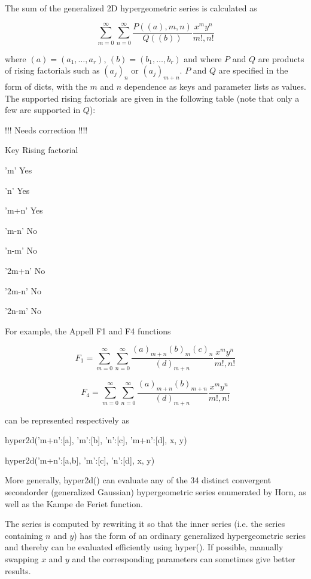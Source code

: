 \vpara
The sum of the generalized 2D hypergeometric series is calculated as

\begin{equation}
\sum_{m=0}^{\infty} \sum_{n=0}^{\infty} \frac{P((a),m,n)}{Q((b))} \frac{x^my^n}{m!,n!}
\end{equation}

where $(a)=(a_1,\ldots,a_r)$, $(b)=(b_1,\ldots,b_r)$ and where $P$ and $Q$ are products of rising factorials such as $(a_j)_n$ or $(a_j)_{m+n}$. $P$ and $Q$ are specified in the form of dicts, with the $m$ and $n$ dependence as keys and parameter lists as values. The supported rising factorials are given in the following table (note that only a few are supported in $Q$):


!!! Needs correction !!!!

Key Rising factorial

'm' Yes

'n' Yes

'm+n' Yes

'm-n' No

'n-m' No

'2m+n' No

'2m-n' No

'2n-m' No

For example, the Appell F1 and F4 functions

\begin{equation}
F_1 = \sum_{m=0}^{\infty} \sum_{n=0}^{\infty} \frac{(a)_{m+n}(b)_m (c)_n}{(d)_{m+n}} \frac{x^my^n}{m!,n!}
\end{equation}

\begin{equation}
F_4 = \sum_{m=0}^{\infty} \sum_{n=0}^{\infty} \frac{(a)_{m+n}(b)_{m+n} }{(d)_{m+n}} \frac{x^my^n}{m!,n!}
\end{equation}


can be represented respectively as

hyper2d({'m+n':[a], 'm':[b], 'n':[c]}, {'m+n':[d]}, x, y)

hyper2d({'m+n':[a,b]}, {'m':[c], 'n':[d]}, x, y)

More generally, hyper2d() can evaluate any of the 34 distinct convergent secondorder (generalized Gaussian) hypergeometric series enumerated by Horn, as well as the Kampe de Feriet function.

The series is computed by rewriting it so that the inner series (i.e. the series containing $n$ and $y$) has the form of an ordinary generalized hypergeometric series and thereby can be evaluated efficiently using hyper(). If possible, manually swapping $x$ and $y$
and the corresponding parameters can sometimes give better results.

